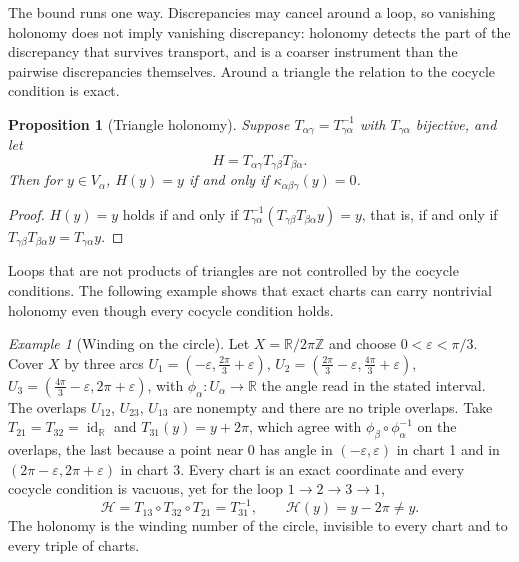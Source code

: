\documentclass[11pt]{article}
\newtheorem{proposition}{Proposition}
\theoremstyle{remark}
\newtheorem{example}{Example}
\newcommand{\R}{\mathbb{R}}
\newcommand{\id}{\operatorname{id}}
\begin{document}
The bound runs one way. Discrepancies may cancel around a loop, so vanishing holonomy does not imply vanishing discrepancy: holonomy detects the part of the discrepancy that survives transport, and is a coarser instrument than the pairwise discrepancies themselves. Around a triangle the relation to the cocycle condition is exact.

\begin{proposition}[Triangle holonomy]\label{prop:trihol}
Suppose $T_{\alpha\gamma}=T_{\gamma\alpha}^{-1}$ with $T_{\gamma\alpha}$ bijective, and let
\[
H=T_{\alpha\gamma}T_{\gamma\beta}T_{\beta\alpha}.
\]
Then for $y\in V_\alpha$, $H(y)=y$ if and only if $\kappa_{\alpha\beta\gamma}(y)=0$.
\end{proposition}

\begin{proof}
$H(y)=y$ holds if and only if $T_{\gamma\alpha}^{-1}(T_{\gamma\beta}T_{\beta\alpha}y)=y$, that is, if and only if $T_{\gamma\beta}T_{\beta\alpha}y=T_{\gamma\alpha}y$.
\end{proof}

Loops that are not products of triangles are not controlled by the cocycle conditions. The following example shows that exact charts can carry nontrivial holonomy even though every cocycle condition holds.

\begin{example}[Winding on the circle]\label{ex:winding}
Let $X=\R/2\pi\mathbb Z$ and choose $0<\varepsilon<\pi/3$. Cover $X$ by three arcs $U_1=(-\varepsilon,\tfrac{2\pi}{3}+\varepsilon)$, $U_2=(\tfrac{2\pi}{3}-\varepsilon,\tfrac{4\pi}{3}+\varepsilon)$, $U_3=(\tfrac{4\pi}{3}-\varepsilon,2\pi+\varepsilon)$, with $\phi_\alpha:U_\alpha\to\R$ the angle read in the stated interval. The overlaps $U_{12}$, $U_{23}$, $U_{13}$ are nonempty and there are no triple overlaps. Take $T_{21}=T_{32}=\id_\R$ and $T_{31}(y)=y+2\pi$, which agree with $\phi_\beta\circ\phi_\alpha^{-1}$ on the overlaps, the last because a point near $0$ has angle in $(-\varepsilon,\varepsilon)$ in chart 1 and in $(2\pi-\varepsilon,2\pi+\varepsilon)$ in chart 3. Every chart is an exact coordinate and every cocycle condition is vacuous, yet for the loop $1\to2\to3\to1$,
\[
\mathcal H=T_{13}\circ T_{32}\circ T_{21}=T_{31}^{-1},\qquad \mathcal H(y)=y-2\pi\neq y .
\]
The holonomy is the winding number of the circle, invisible to every chart and to every triple of charts.
\end{example}
\end{document}
